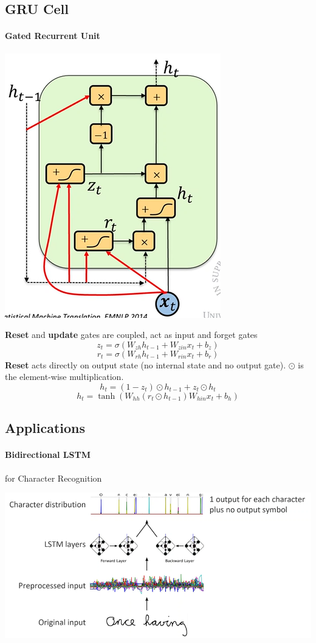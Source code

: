 \documentclass[10pt]{report}
\begin{document}
\subsection{GRU Cell}
\paragraph{Gated Recurrent Unit}\begin{center}
	\includegraphics[scale=0.5]{98.png}
\end{center}
\textbf{Reset} and \textbf{update} gates are coupled, act as input and forget gates 
$$z_t =\sigma(W_{zh}h_{t-1} + W_{zin}x_t + b_z)$$
$$r_t =\sigma(W_{rh}h_{t-1} + W_{rin}x_t + b_r)$$
\textbf{Reset} acts directly on output state (no internal state and no output gate). $\odot$ is the element-wise multiplication.
$$h_t = (1 - z_t)\odot h_{t-1} + z_t\odot h_t$$
$$h_t = \tanh(W_{hh}(r_t\odot h_{t-1}) W_{hin}x_t + b_h)$$
\subsection{Applications}
\paragraph{Bidirectional LSTM} for Character Recognition
\begin{center}
	\includegraphics[scale=0.5]{99.png}
\end{center}
\end{document}

